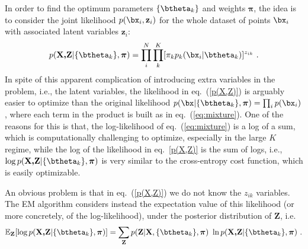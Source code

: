In order to find the optimum parameters $\{\btheta_k\}$ and weights $\boldsymbol{\pi}$, the idea is to consider the joint likelihood $p(\bx_i, \textbf{z}_i)$ 
for the whole dataset of points $\bx_i$ with associated latent variables $\textbf{z}_i$:
\begin{equation}
\label{p(X,Z)}
p(\textbf{X,Z}|\{\btheta_k\},\boldsymbol{\pi})
=\prod_i^N \prod_k^K [\pi_k p_k(\bx_i|\btheta_k)]^{z_{ik}}~.
\end{equation}
In spite of this apparent complication of introducing extra variables in the problem, i.e., the latent variables, the likelihood in eq.~(\ref{p(X,Z)}) is arguably easier to optimize than the original likelihood $p(\bx|\{\btheta_k\},\boldsymbol{\pi}) = \prod_i p(\bx_i)$, where each term in the product is built as in eq.~(\ref{eq:mixture}). One of the reasons for this is that, the log-likelihood of eq.~(\ref{eq:mixture}) is a log of a sum, which is computationally challenging to optimize, especially in the large $K$ regime, while the log of the likelihood in eq.~\ref{p(X,Z)} is the sum of logs, i.e., $\log p(\textbf{X,Z}|\{\btheta_k\},\boldsymbol{\pi})$ is very similar to the cross-entropy cost function, which is easily optimizable.  

An obvious problem is that in eq.~(\ref{p(X,Z)}) we do not know the $z_{ik}$ variables. The EM algorithm considers instead the expectation value of this likelihood (or more concretely, of the log-likelihood), under the posterior distribution of $\textbf{Z}$, i.e.
\begin{equation}
\label{E_log}
\mathbb{E}_\textbf{Z} 
[\log p(\textbf{X,Z}|\{\btheta_k\},\boldsymbol{\pi}) ] =
\sum_\textbf{Z} 
p(\textbf{Z}|\textbf{X},\{\btheta_k\},\boldsymbol{\pi})~
\ln p(\textbf{X,Z}|\{\btheta_k\},\boldsymbol{\pi})~.
\end{equation}

